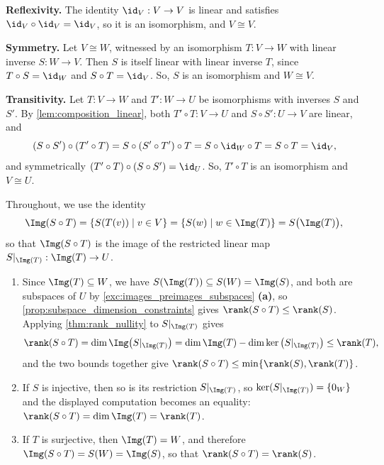 \begin{exercisesolution}
\label{sol:iso_equivalence_relation}
\textbf{Reflexivity.} The identity $\id_V: V \to V$ is linear and satisfies $\id_V \circ \id_V = \id_V$, so it is an isomorphism, and $V \cong V$.

\textbf{Symmetry.} Let $V \cong W$, witnessed by an isomorphism $T: V \to W$ with linear inverse $S: W \to V$. Then $S$ is itself linear with linear inverse $T$, since $T \circ S = \id_W$ and $S \circ T = \id_V$. So, $S$ is an isomorphism and $W \cong V$.

\textbf{Transitivity.} Let $T: V \to W$ and $T': W \to U$ be isomorphisms with inverses $S$ and $S'$. By \cref{lem:composition_linear}, both $T' \circ T: V \to U$ and $S \circ S': U \to V$ are linear, and
\[
(S \circ S') \circ (T' \circ T) = S \circ (S' \circ T') \circ T = S \circ \id_W \circ T = S \circ T = \id_V,
\]
and symmetrically $(T' \circ T) \circ (S \circ S') = \id_U$. So, $T' \circ T$ is an isomorphism and $V \cong U$.
\end{exercisesolution}

\begin{exercisesolution}
\label{sol:rank_of_composition}
Throughout, we use the identity
\[
\Img(S \circ T) = \{S(T(v)) \mid v \in V\} = \{S(w) \mid w \in \Img(T)\} = S\big(\Img(T)\big),
\]
so that $\Img(S \circ T)$ is the image of the restricted linear map $S|_{\Img(T)}: \Img(T) \to U$.

\begin{enumerate}[label=\textbf{(\alph*)}]
    \item Since $\Img(T) \subseteq W$, we have $S(\Img(T)) \subseteq S(W) = \Img(S)$, and both are subspaces of $U$ by \cref{exc:images_preimages_subspaces} \textbf{(a)}, so \cref{prop:subspace_dimension_constraints} gives $\rank(S \circ T) \le \rank(S)$. Applying \cref{thm:rank_nullity} to $S|_{\Img(T)}$ gives
    \[
    \rank(S \circ T) = \dim \Img\big(S|_{\Img(T)}\big) = \dim \Img(T) - \dim \ker\big(S|_{\Img(T)}\big) \le \rank(T),
    \]
    and the two bounds together give $\rank(S \circ T) \le \min\{\rank(S), \rank(T)\}$.
    \item If $S$ is injective, then so is its restriction $S|_{\Img(T)}$, so $\ker(S|_{\Img(T)}) = \{0_W\}$ and the displayed computation becomes an equality: $\rank(S \circ T) = \dim \Img(T) = \rank(T)$.
    \item If $T$ is surjective, then $\Img(T) = W$, and therefore $\Img(S \circ T) = S(W) = \Img(S)$, so that $\rank(S \circ T) = \rank(S)$. \qedhere
\end{enumerate}
\end{exercisesolution}

